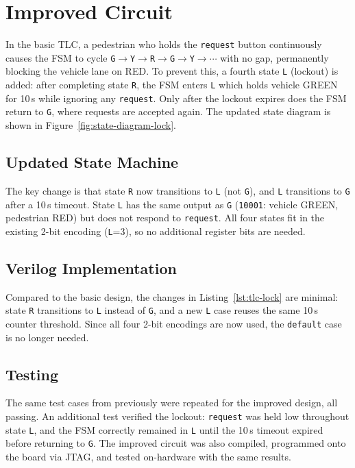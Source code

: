\documentclass[10pt,a4paper]{article}
\theoremstyle{definition} %
\begin{document}
\section{Improved Circuit}

In the basic TLC, a pedestrian who holds the \texttt{request} button continuously causes the FSM to cycle \texttt{G}$\to$\texttt{Y}$\to$\texttt{R}$\to$\texttt{G}$\to$\texttt{Y}$\to\cdots$ with no gap, permanently blocking the vehicle lane on RED. To prevent this, a fourth state \texttt{L} (lockout) is added: after completing state \texttt{R}, the FSM enters \texttt{L} which holds vehicle GREEN for 10\,s while ignoring any \texttt{request}. Only after the lockout expires does the FSM return to \texttt{G}, where requests are accepted again. The updated state diagram is shown in Figure~\ref{fig:state-diagram-lock}.

\subsection{Updated State Machine}



The key change is that state \texttt{R} now transitions to \texttt{L} (not \texttt{G}), and \texttt{L} transitions to \texttt{G} after a 10\,s timeout. State \texttt{L} has the same output as \texttt{G} (\texttt{10001}: vehicle GREEN, pedestrian RED) but does not respond to \texttt{request}. All four states fit in the existing 2-bit encoding (\texttt{L}=3), so no additional register bits are needed.

\subsection{Verilog Implementation}



Compared to the basic design, the changes in Listing~\ref{lst:tlc-lock} are minimal: state \texttt{R} transitions to \texttt{L} instead of \texttt{G}, and a new \texttt{L} case reuses the same 10\,s counter threshold. Since all four 2-bit encodings are now used, the \texttt{default} case is no longer needed.

\subsection{Testing}

The same test cases from previously were repeated for the improved design, all passing. An additional test verified the lockout: \texttt{request} was held low throughout state \texttt{L}, and the FSM correctly remained in \texttt{L} until the 10\,s timeout expired before returning to \texttt{G}. The improved circuit was also compiled, programmed onto the board via JTAG, and tested on-hardware with the same results.
\end{document}
